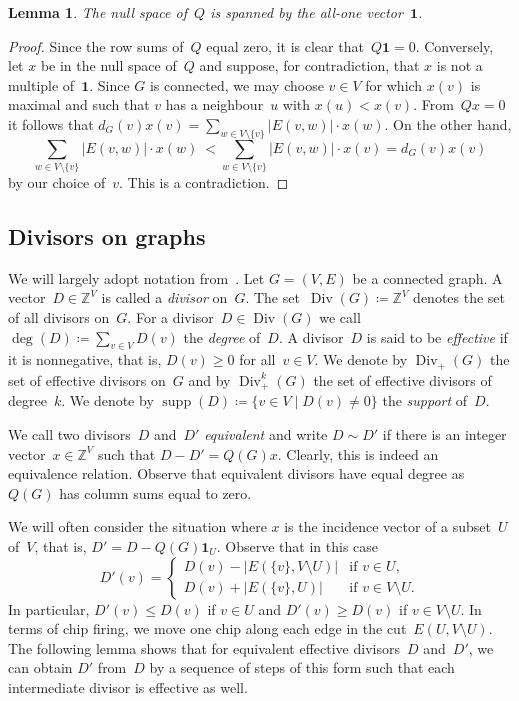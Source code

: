 \documentclass[10pt]{amsart}
\newtheorem{lemma}[theorem]{Lemma}
\newcommand{\Z}{\ensuremath{\mathbb{Z}}}
\newcommand{\one}{\ensuremath{\mathbf{1}}}
\DeclareMathOperator{\Div}{Div}
\DeclareMathOperator{\supp}{supp}
\begin{document}
\begin{lemma}\label{Laplacian}
The null space of~$Q$ is spanned by the all-one vector~$\one$.
\end{lemma}
\begin{proof}
Since the row sums of~$Q$ equal zero, it is clear that~$Q\one=0$. Conversely, let $x$ be in the null space of~$Q$ and suppose, for contradiction, that $x$ is not a multiple of~$\one$. Since $G$ is connected, we may choose $v\in V$ for which $x(v)$ is maximal and such that $v$ has a neighbour~$u$ with $x(u) < x(v)$. From~$Qx=0$ it follows that $d_G(v)x(v)=\sum_{w\in V\setminus\{v\}} |E(v,w)|\cdot x(w)$. On the other hand,
\begin{equation*}
\sum_{w\in V\setminus\{v\}}|E(v,w)|\cdot x(w)\ < \sum_{w\in V\setminus\{v\}}|E(v,w)|\cdot x(v)= d_G(v)x(v)
\end{equation*}
by our choice of~$v$. This is a contradiction. 
\end{proof}

 
\subsection{Divisors on graphs}
We will largely adopt notation from~\cite{BakerNorine2007}. Let $G=(V,E)$ be a connected graph. A vector~$D\in \Z^V$ is called a \emph{divisor} on~$G$. The set~$\Div(G)\coloneqq \Z^V$ denotes the set of all divisors on~$G$. For a divisor~$D\in \Div(G)$ we call $\deg(D)\coloneqq \sum_{v\in V}D(v)$ the \emph{degree} of~$D$. A divisor~$D$ is said to be \emph{effective} if it is nonnegative, that is, $D(v)\geq 0$ for all~$v\in V$. We denote by $\Div_+(G)$ the set of effective divisors on~$G$ and by $\Div_+^k(G)$ the set of effective divisors of degree~$k$. We denote by $\supp(D)\coloneqq \{v\in V\mid D(v)\neq 0\}$ the \emph{support} of~$D$.

We call two divisors~$D$ and~$D'$ \emph{equivalent} and write $D\sim D'$ if there is an integer vector~$x\in \Z^V$ such that $D-D'=Q(G)x$. Clearly, this is indeed an equivalence relation. Observe that equivalent divisors have equal degree as $Q(G)$ has column sums equal to zero. 

We will often consider the situation where $x$ is the incidence vector of a subset~$U$ of~$V$, that is, $D'=D-Q(G)\one_U$. Observe that in this case 
\begin{equation}
D'(v)=\begin{cases}D(v)-|E(\{v\},V\setminus U)|&\text{if $v\in U$},\\D(v)+|E(\{v\},U)|&\text{if $v\in V\setminus U$.}\end{cases}
\end{equation}
In particular, $D'(v)\leq D(v)$ if $v\in U$ and $D'(v)\geq D(v)$ if $v\in V\setminus U$. In terms of chip firing, we move one chip along each edge in the cut~$E(U,V\setminus U)$. The following lemma shows that for equivalent effective divisors~$D$ and~$D'$, we can obtain $D'$ from~$D$ by a sequence of steps of this form such that each intermediate divisor is effective as well.
\end{document}
